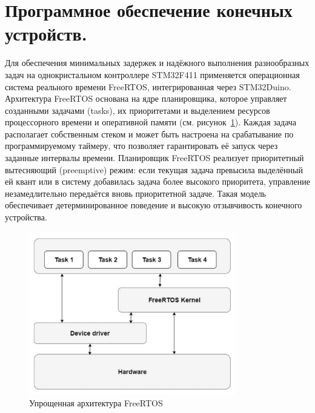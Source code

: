 \documentclass[14pt, a4paper]{extreport}
\begin{document}

\section{Программное обеспечение конечных устройств.}

Для обеспечения минимальных задержек и надёжного выполнения разнообразных задач на однокристальном контроллере STM32F411 применяется операционная система реального времени FreeRTOS,
интегрированная через STM32Duino. Архитектура FreeRTOS основана на ядре планировщика, которое управляет созданными задачами (tasks), их приоритетами и выделением ресурсов процессорного
времени и оперативной памяти (см. рисунок~\ref{fig:simple_arch_of_FreeRTOS}). Каждая задача располагает собственным стеком и может быть настроена на срабатывание по программируемому
таймеру, что позволяет гарантировать её запуск через заданные интервалы времени. Планировщик FreeRTOS реализует приоритетный вытесняющий (preemptive) режим: если текущая задача
превысила выделённый ей квант или в систему добавилась задача более высокого приоритета, управление незамедлительно передаётся вновь приоритетной задаче. Такая модель обеспечивает
детерминированное поведение и высокую отзывчивость конечного устройства.

\begin{figure}[ht]
    \centering
    \includegraphics[width=0.8\textwidth]{images/FreeRTOS_arch.png}
    \caption{Упрощенная архитектура FreeRTOS \cite{IMG_RTOS_architectures}}
    \label{fig:simple_arch_of_FreeRTOS}
\end{figure}
\end{document}
